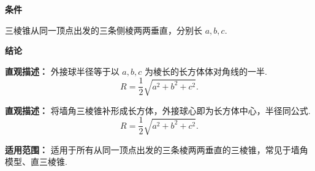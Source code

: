 \begin{statementbox}
	\textbf{\textcolor{CStatement}{条件}}
	\begin{description}[style=nextline, leftmargin=2.8em, labelsep=0.5em, itemsep=0.35em]
		\item[\textbf{\textcolor{CStatement}{条件1（两两垂直）：}}]
			三棱锥从同一顶点出发的三条侧棱两两垂直，分别长 $a,b,c$.
	\end{description}
	\textbf{\textcolor{CStatement}{结论}}
	\begin{description}[style=nextline, leftmargin=2.8em, labelsep=0.5em, itemsep=0.45em]
		\item[\textbf{\textcolor{CStatement}{结论一（外接球半径）：}}]
			\textbf{\textcolor{CStatement}{直观描述：}}
			外接球半径等于以 $a,b,c$ 为棱长的长方体体对角线的一半.
			\[
				R = \frac{1}{2}\sqrt{a^{2}+b^{2}+c^{2}}.
			\]
		\item[\textbf{\textcolor{CStatement}{常见变形（补形法）：}}]
			\textbf{\textcolor{CStatement}{直观描述：}}
			将墙角三棱锥补形成长方体，外接球心即为长方体中心，半径同公式.
			\[
				R = \frac{1}{2}\sqrt{a^{2}+b^{2}+c^{2}}.
			\]
	\end{description}
	\textbf{\textcolor{CStatement}{适用范围：}}
	适用于所有从同一顶点出发的三条棱两两垂直的三棱锥，常见于墙角模型、直三棱锥.
\end{statementbox}
